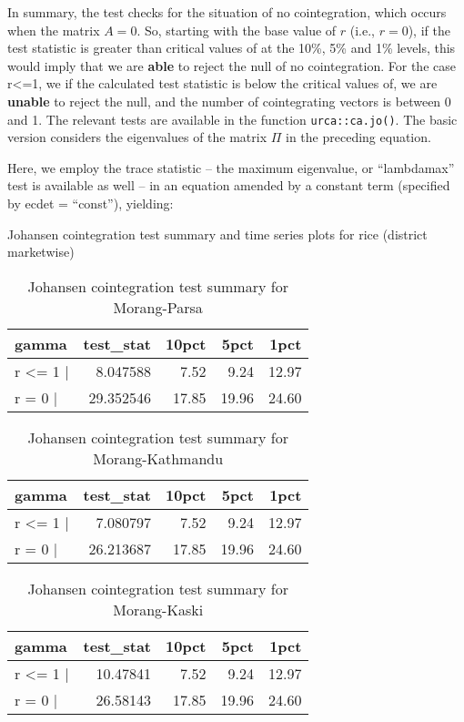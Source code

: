 \documentclass[12pt,]{article}
\begin{document}
In summary, the test checks for the situation of no cointegration, which occurs when the matrix \(A=0\). So, starting with the base value of \(r\) (i.e., \(r=0\)), if the test statistic is greater than critical values of at the 10\%, 5\% and 1\% levels, this would imply that we are \textbf{able} to reject the null of no cointegration. For the case r\textless{}=1, we if the calculated test statistic is below the critical values of, we are \textbf{unable} to reject the null, and the number of cointegrating vectors is between 0 and 1. The relevant tests are available in the function \texttt{urca::ca.jo()}. The basic version considers the eigenvalues of the matrix \(\Pi\) in the preceding equation.

Here, we employ the trace statistic -- the maximum eigenvalue, or ``lambdamax'' test is available as well -- in an equation amended by a constant term (specified by ecdet = ``const''), yielding:

Johansen cointegration test summary and time series plots for rice (district marketwise)

\begin{longtable}[t]{lrrrr}
\caption{\label{tab:rice-cajo-test}Johansen cointegration test summary for Morang-Parsa}\\
\toprule
gamma & test\_stat & 10pct & 5pct & 1pct\\
\midrule
r <= 1 | & 8.047588 & 7.52 & 9.24 & 12.97\\
r = 0  | & 29.352546 & 17.85 & 19.96 & 24.60\\
\bottomrule
\end{longtable}

\begin{longtable}[t]{lrrrr}
\caption{\label{tab:rice-cajo-test}Johansen cointegration test summary for Morang-Kathmandu}\\
\toprule
gamma & test\_stat & 10pct & 5pct & 1pct\\
\midrule
r <= 1 | & 7.080797 & 7.52 & 9.24 & 12.97\\
r = 0  | & 26.213687 & 17.85 & 19.96 & 24.60\\
\bottomrule
\end{longtable}

\begin{longtable}[t]{lrrrr}
\caption{\label{tab:rice-cajo-test}Johansen cointegration test summary for Morang-Kaski}\\
\toprule
gamma & test\_stat & 10pct & 5pct & 1pct\\
\midrule
r <= 1 | & 10.47841 & 7.52 & 9.24 & 12.97\\
r = 0  | & 26.58143 & 17.85 & 19.96 & 24.60\\
\bottomrule
\end{longtable}
\end{document}
